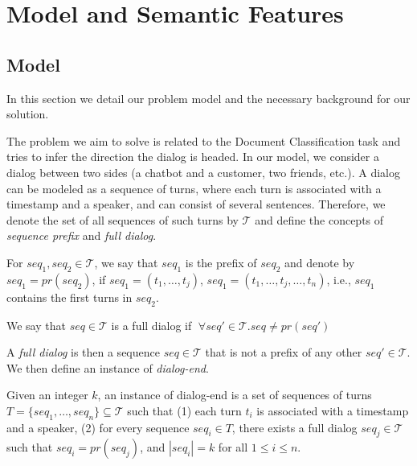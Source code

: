 \section{Model and Semantic Features}\label{sec:model}

\subsection{Model}
In this section we detail our problem model and the necessary background 
for our solution.

The problem we aim to solve is related to the Document Classification task 
\cite{attention,Slonim:2002:UDC:564376.564401,DBLP:journals/tkde/IsaLKR08} 
and tries to infer the direction the dialog is headed. 
In our model, we consider a dialog between two sides (a chatbot and a customer, two friends, etc.). 
A dialog can be modeled as a sequence of turns, 
where each turn is associated with a timestamp and a speaker, and can consist of several sentences. 
Therefore, we denote the set of all sequences of 
such turns by $\mathcal{T}$ and define the concepts of {\em sequence prefix} and {\em full dialog}. 

\begin{definition}
For $seq_1, seq_2 \in \mathcal{T}$, we say that $seq_1$ is the 
prefix of $seq_2$ and denote by $seq_1 = pr(seq_2)$, if 
$seq_1 = (t_1, \ldots, t_j)$, $seq_1 = (t_1, \ldots, t_j, \ldots, t_n)$, i.e., $seq_1$ contains the first 
turns in $seq_2$. 

We say that $seq \in \mathcal{T}$ is a full dialog if $\;\forall seq' \in \mathcal{T}. seq \neq pr(seq')\; $ 
\end{definition}

A {\em full dialog} is then a sequence $seq \in \mathcal{T}$ that is not a prefix 
of any other $seq' \in \mathcal{T}$. 
We then define an instance of {\em dialog-end}. 

\begin{definition}\label{def:target}
Given an integer $k$, an instance of dialog-end is a set of sequences of turns $T=\{seq_1, \ldots, seq_n\} \subseteq \mathcal{T}$ such that 
(1) each turn $t_i$ is associated with a timestamp and a speaker, (2) for every sequence $seq_i\in T$, there exists a full dialog $seq_j\in \mathcal{T}$ such that $seq_i = pr(seq_j)$, and $|seq_i| = k$ for all $1\leq i \leq n$.
\end{definition}


